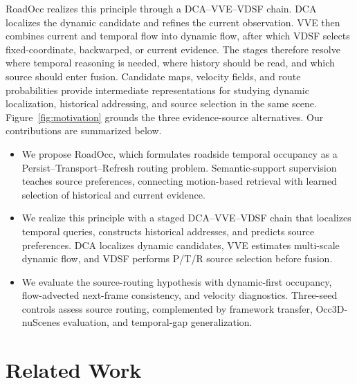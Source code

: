 \documentclass{article}
\newcommand{\method}{RoadOcc}
\begin{document}
RoadOcc realizes this principle through a DCA--VVE--VDSF chain. DCA
localizes the dynamic candidate and refines the current observation. VVE then
combines current and temporal flow into dynamic flow, after which VDSF selects
fixed-coordinate, backwarped, or current evidence. The stages therefore resolve
where temporal reasoning is needed, where history should be read, and which
source should enter fusion. Candidate maps, velocity fields, and route
probabilities provide intermediate representations for studying dynamic
localization, historical addressing, and source selection in the same scene.
Figure~\ref{fig:motivation} grounds the three evidence-source alternatives. 
Our contributions are summarized below.



\begin{itemize}[leftmargin=10pt]
  \item We propose \method{}, which formulates roadside temporal occupancy as
  a Persist--Transport--Refresh routing problem. Semantic-support supervision
  teaches source preferences, connecting motion-based retrieval with learned
  selection of historical and current evidence.
  \item We realize this principle with a staged DCA--VVE--VDSF chain that
  localizes temporal queries, constructs historical addresses, and predicts
  source preferences. DCA localizes dynamic candidates, VVE estimates
  multi-scale dynamic flow, and VDSF performs P/T/R
  source selection before fusion.
  \item We evaluate the source-routing hypothesis with dynamic-first occupancy,
  flow-advected next-frame consistency, and velocity diagnostics.
  Three-seed controls assess source routing, complemented by framework
  transfer, Occ3D-nuScenes evaluation, and temporal-gap generalization.
\end{itemize}

\section{Related Work}
\label{sec:related}
\end{document}
